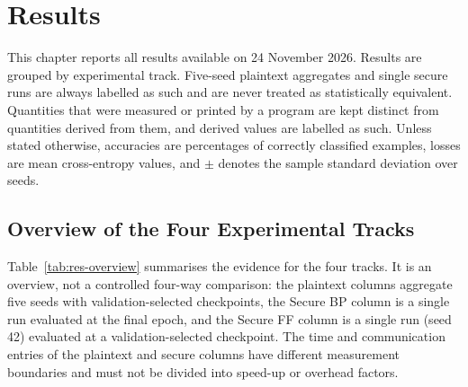 \chapter{Results}\label{chap:results}

This chapter reports all results available on 24 November 2026. Results are grouped by experimental track. Five-seed plaintext aggregates and single secure runs are always labelled as such and are never treated as statistically equivalent. Quantities that were measured or printed by a program are kept distinct from quantities derived from them, and derived values are labelled as such. Unless stated otherwise, accuracies are percentages of correctly classified examples, losses are mean cross-entropy values, and $\pm$ denotes the sample standard deviation over seeds.

\section{Overview of the Four Experimental Tracks}\label{sec:res-overview}
Table~\ref{tab:res-overview} summarises the evidence for the four tracks. It is an overview, not a controlled four-way comparison: the plaintext columns aggregate five seeds with validation-selected checkpoints, the Secure BP column is a single run evaluated at the final epoch, and the Secure FF column is a single run (seed 42) evaluated at a validation-selected checkpoint. The time and communication entries of the plaintext and secure columns have different measurement boundaries and must not be divided into speed-up or overhead factors.

